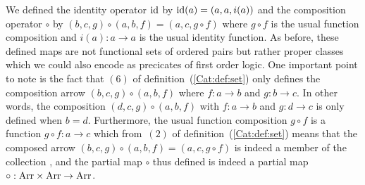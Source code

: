 We defined the identity operator $\mbox{\rm id}$ by $\mbox{\rm id}(a)=(a,a,i(a))$ and the 
composition operator $\circ$ by $(b,c,g)\circ(a,b,f)= (a,c,g\circ f)$ 
where $g\circ f$ is the usual function composition and $i(a):a\to a$ is
the usual identity function. As before, these defined maps are not 
functional sets of ordered pairs but rather proper classes which we 
could also encode as precicates of first order logic. One important
point to note is the fact that $(6)$ of definition~(\ref{Cat:def:set})
only defines the composition arrow $(b,c,g)\circ(a,b,f)$ where
$f:a\to b$ and $g:b\to c$. In other words, the composition 
$(d,c,g)\circ(a,b,f)$ with $f:a\to b$ and $g:d\to c$ is only 
defined when $b=d$. Furthermore, the usual function composition
$g\circ f$ is a function $g\circ f:a \to c$ which from~$(2)$ of
definition~(\ref{Cat:def:set}) means that the composed arrow
$(b,c,g)\circ(a,b,f)=(a,c,g\circ f)$ is indeed a member of the
collection \arr, and the partial map $\circ$ thus defined is 
indeed a partial map $\circ:\mbox{\rm Arr}\times\mbox{\rm Arr}\to\mbox{\rm Arr}$.


